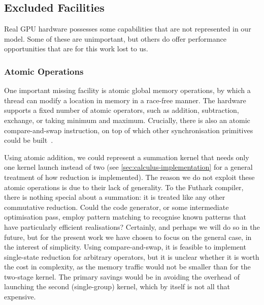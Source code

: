 \subsection{Excluded Facilities}

Real GPU hardware possesses some capabilities that are not represented
in our model.  Some of these are unimportant, but others do offer
performance opportunities that are for this work lost to us.

\subsubsection{Atomic Operations}

One important missing facility is atomic global memory operations, by
which a thread can modify a location in memory in a race-free manner.
The hardware supports a fixed number of atomic operators, such as
addition, subtraction, exchange, or taking minimum and maximum.
Crucially, there is also an atomic compare-and-swap instruction, on
top of which other synchronisation primitives could be
built~\cite{fraser2004practical}.

Using atomic addition, we could represent a summation kernel that
needs only one kernel launch instead of two (see
\cref{sec:calculus-implementation} for a general treatment of how
reduction is implemented).  The reason we do not exploit these atomic
operations is due to their lack of generality.  To the Futhark
compiler, there is nothing special about a summation: it is treated
like any other commutative reduction.  Could the code generator, or
some intermediate optimisation pass, employ pattern matching to
recognise known patterns that have particularly efficient
realisations?  Certainly, and perhaps we will do so in the future, but
for the present work we have chosen to focus on the general case, in
the interest of simplicity.  Using compare-and-swap, it is feasible to
implement single-state reduction for arbitrary operators, but it is
unclear whether it is worth the cost in complexity, as the memory
traffic would not be smaller than for the two-stage kernel.  The
primary savings would be in avoiding the overhead of launching the
second (single-group) kernel, which by itself is not all that
expensive.

